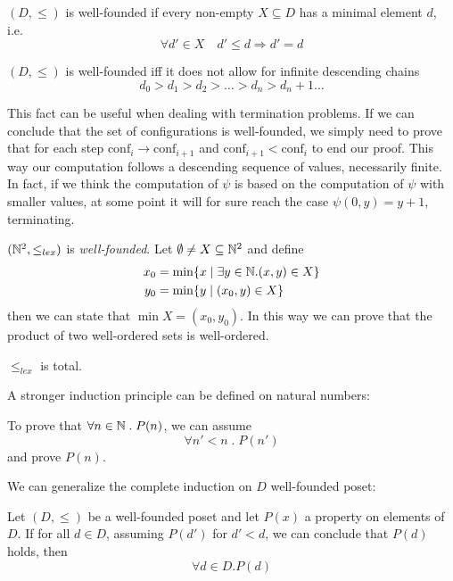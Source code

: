 \begin{definition}
  $(D, \leq)$ is well-founded if every non-empty $X \subseteq D$ has a minimal element $d$, i.e.
  \[  
  \forall d' \in X \quad d' \leq d \Rightarrow d' = d
  \]
\end{definition}

\begin{observation}
  $(D, \leq)$ is well-founded iff it does not allow for
  infinite descending chains
  \[
    d_0 > d_1 > d_2 > \dots > d_n > d_n+1 \dots
  \]
\end{observation}
\newcommand{\conf}{\text{conf}} 
This fact can be useful when dealing
with termination problems. If we can conclude that the set of
configurations is well-founded, we simply need to prove
that for each step \( \conf _i \rightarrow \conf_{i+1} \) and
\( \conf _{i+1} < \conf _i \) to end our proof. This way our computation follows a descending sequence of values, necessarily finite.
In fact, if we think the computation of $\psi$ is based on the
computation of $\psi$ with smaller values, at some point it
will for sure reach the case $\psi(0,y) = y + 1$, terminating.

\begin{example}
  $(\mathbb{N}^2, \leq_{lex})$ is \emph{well-founded}.
Let $\emptyset \neq X \subseteq \mathbb{N}^2$ and define
\begin{align*}
  x_0 &= \min\{x \mid \exists y \in \mathbb{N} . (x,y) \in X\} \\
  y_0 &= \min \{ y \; | \; (x_0,y) \in X\}
\end{align*}
then we can state that
$\min X = (x_0, y_0)$. In this way we can prove that the product of
two well-ordered sets is well-ordered.
\end{example}
\begin{observation}
  $\leq_{lex}$ is total.
\end{observation}

A stronger induction principle can be defined on natural numbers:
\begin{definition}
  To prove that $\forall n\in\mathbb{N} \;.\; P(n)$, we can assume 
  \[
    \forall n'<n\;.\; P(n')
    \]
  and prove $P(n)$.
\end{definition}
We can generalize the complete induction on $D$ well-founded poset:
\begin{definition}
  Let $(D, \leq)$ be a well-founded poset and let $P(x)$ a
  property on elements of $D$. If for all $d \in D$, assuming $P(d')$ for
  $d' < d$, we can conclude that $P(d)$ holds, then
  \[
    \forall d\in D. P(d)
  \]
\end{definition}

